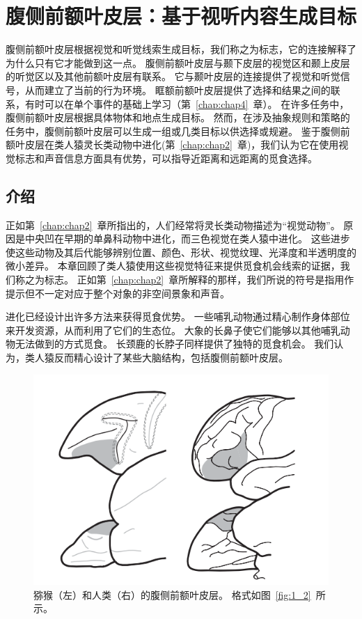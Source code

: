 \chapter{腹侧前额叶皮层：基于视听内容生成目标} \label{chap:chap7}


腹侧前额叶皮层根据视觉和听觉线索生成目标，我们称之为标志，它的连接解释了为什么只有它才能做到这一点。
腹侧前额叶皮层与颞下皮层的视觉区和颞上皮层的听觉区以及其他前额叶皮层有联系。
它与颞叶皮层的连接提供了视觉和听觉信号，从而建立了当前的行为环境。
眶额前额叶皮层提供了选择和结果之间的联系，有时可以在单个事件的基础上学习（第~\ref{chap:chap4}~章）。
在许多任务中，腹侧前额叶皮层根据具体物体和地点生成目标。
然而，在涉及抽象规则和策略的任务中，腹侧前额叶皮层可以生成一组或几类目标以供选择或规避。
鉴于腹侧前额叶皮层在类人猿灵长类动物中进化(第~\ref{chap:chap2}~章)，我们认为它在使用视觉标志和声音信息方面具有优势，可以指导近距离和远距离的觅食选择。


\section{介绍}
\par

正如第~\ref{chap:chap2}~章所指出的，人们经常将灵长类动物描述为“视觉动物”。
原因是中央凹在早期的单鼻科动物中进化，而三色视觉在类人猿中进化。 
这些进步使这些动物及其后代能够辨别位置、颜色、形状、视觉纹理、光泽度和半透明度的微小差异。
本章回顾了类人猿使用这些视觉特征来提供觅食机会线索的证据，我们称之为标志。
正如第~\ref{chap:chap2}~章所解释的那样，我们所说的符号是指用作提示但不一定对应于整个对象的非空间景象和声音。
\par
进化已经设计出许多方法来获得觅食优势。
一些哺乳动物通过精心制作身体部位来开发资源，从而利用了它们的生态位。
大象的长鼻子使它们能够以其他哺乳动物无法做到的方式觅食。
长颈鹿的长脖子同样提供了独特的觅食机会。
我们认为，类人猿反而精心设计了某些大脑结构，包括腹侧前额叶皮层。

\begin{figure} 
	\centering
	\includegraphics[width=0.7\linewidth]{image_pfc/Fig_7_1}
	\caption{猕猴（左）和人类（右）的腹侧前额叶皮层。
		格式如图~\ref{fig:1_2}~所示。\label{fig:7_1}}
\end{figure}
\par

